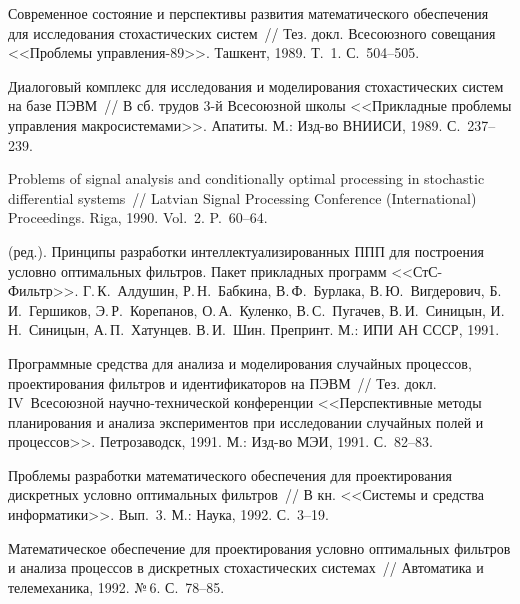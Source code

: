 \begin{multicols}{2}
{{\begin{thebibliography}{99}
Современное состояние и
перспективы развития математического обеспечения для исследования
стохастических сис\-тем~// Тез. докл. Всесоюзного совещания <<Проблемы
управления-89>>. Ташкент, 1989. Т.~1. С.~504--505.

Диалоговый комплекс для исследования и моделирования
стохастических систем на базе ПЭВМ~// В сб. трудов 3-й Всесоюзной
школы <<Прикладные проблемы управления мак\-ро\-сис\-те\-ма\-ми>>.
Апатиты. М.: Изд-во ВНИИСИ, 1989. С.~237--239.

Problems of signal
analysis and conditionally optimal processing in stochastic
differential systems~// Latvian Signal
Processing  Conference (International) Proceedings. Riga, 1990. Vol.~2. P.~60--64.

(ред.). Принципы разработки
интеллектуализированных ППП для построения условно оптимальных
фильтров. Пакет прикладных программ <<СтС-Фильтр>>.
Г.\,К.~Алдушин, Р.\,Н.~Бабкина, В.\,Ф.~Бурлака, В.\,Ю.~Вигдерович,
Б.\,И.~Гершиков, Э.\,Р.~Корепанов, О.\,А.~Куленко, В.\,С.~Пугачев,
В.\,И.~Синицын, И.\,Н.~Синицын, А.\,П.~Хатунцев. В.\,И.~Шин. Препринт.
М.: ИПИ АН СССР, 1991.

Программные средства
для анализа и моделирования случайных процессов, проектирования
фильтров и идентификаторов на ПЭВМ~// Тез. докл. IV~Всесоюзной
научно-технической  конференции <<Перспективные методы
планирования и анализа экспериментов при исследовании случайных
полей и процессов>>. Петрозаводск, 1991. М.: Изд-во
МЭИ, 1991. С.~82--83.

Проблемы разработки математического обеспечения
для проектирования дискретных условно оптимальных фильтров~// В
кн. <<Системы и средства информатики>>. Вып.~3. М.: Наука,
1992.  С.~3--19.

Математическое обеспечение для проектирования
условно оптимальных фильтров и анализа процессов в дискретных
стохастических системах~// Автоматика и телемеханика, 1992.
№\,6. С.~78--85.


\end{thebibliography}}}
\end{multicols}
